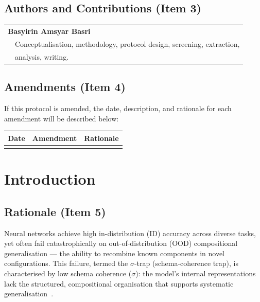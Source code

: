 \subsection{Authors and Contributions (Item 3)}

\begin{tabular}{ll}
\multicolumn{2}{l}{\textbf{Basyirin Amsyar Basri}} \\
& Conceptualisation, methodology, protocol design, screening, extraction, \\
& analysis, writing.
\end{tabular}

\subsection{Amendments (Item 4)}

If this protocol is amended, the date, description, and rationale for each amendment will be described below:

\medskip
\begin{tabular}{p{2cm} p{3cm} p{6cm}}
\toprule
\textbf{Date} & \textbf{Amendment} & \textbf{Rationale} \\
\midrule
& & \\
\bottomrule
\end{tabular}

\section{Introduction}\label{sec:introduction}

\subsection{Rationale (Item 5)}

Neural networks achieve high in-distribution (ID) accuracy across diverse tasks, yet often fail catastrophically on out-of-distribution (OOD) compositional generalisation --- the ability to recombine known components in novel configurations. This failure, termed the $\sigma$-trap (schema-coherence trap), is characterised by low schema coherence ($\sigma$): the model's internal representations lack the structured, compositional organisation that supports systematic generalisation~\cite{lake2018generalization, keysers2020measuring, huvard2023notion}.


